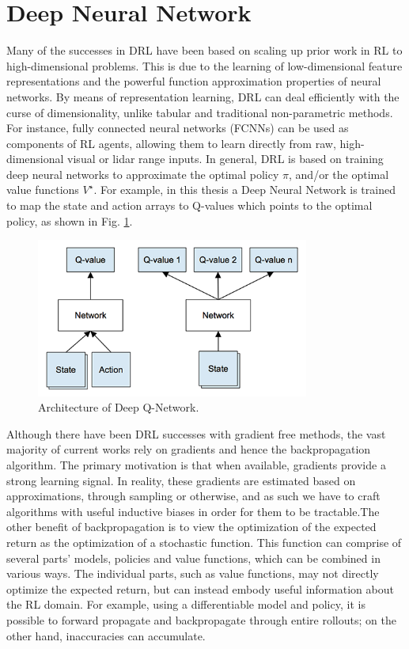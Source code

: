 \section{Deep Neural Network}

Many of the successes in DRL have been based on scaling up prior work in RL to high-dimensional problems. This is due to the learning of low-dimensional feature representations and the powerful function approximation properties of neural networks. By means of representation learning, DRL can deal efficiently with the curse of dimensionality, unlike tabular and traditional non-parametric methods. For instance, fully connected neural networks (FCNNs) can be used as components of RL agents, allowing them to learn directly from raw, high-dimensional visual or lidar range inputs. In general, DRL is based on training deep neural networks to approximate the optimal policy $\pi$, and/or the optimal value functions $V^\star$. For example, in this thesis a Deep Neural Network is trained to map the state and action arrays to Q-values which points to the optimal policy, as shown in Fig. \ref{fig:dqn-architecture}. 

\begin{figure}[h]
\centering
\includegraphics[width=0.8\textwidth]{figs/ch4/architecture-of-deep-q-network}
\caption{Architecture of Deep Q-Network.}
\label{fig:dqn-architecture}
\end{figure}

Although there have been DRL successes with gradient free methods, the vast majority of current works rely on gradients and hence the backpropagation algorithm. The primary motivation is that when available, gradients provide a strong learning signal. In reality, these gradients are estimated based on approximations, through sampling or otherwise, and as such we have to craft algorithms with useful inductive biases in order for them to be tractable.The other benefit of backpropagation is to view the optimization of the expected return as the optimization of a stochastic function. This function can comprise of several parts' models, policies and value functions, which can be combined in various ways. The individual parts, such as value functions, may not directly optimize the expected return, but can instead embody useful information about the RL domain. For example, using a differentiable model and policy, it is possible to forward propagate and backpropagate through entire rollouts; on the other hand, inaccuracies can accumulate.

